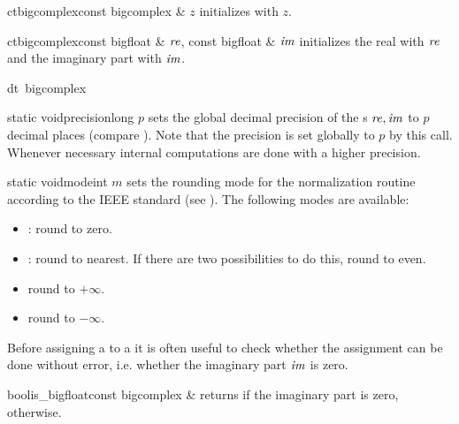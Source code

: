 \begin{fcode}{ct}{bigcomplex}{const bigcomplex & $z$}
  initializes with $z$.
\end{fcode}

\begin{fcode}{ct}{bigcomplex}{const bigfloat & $\mathit{re}$, const bigfloat & $\mathit{im}$}
  initializes the real with $\mathit{re}$ and the imaginary part with $\mathit{im}$.
\end{fcode}

\begin{fcode}{dt}{~bigcomplex}{}
\end{fcode}



\INIT

\begin{fcode}{static void}{precision}{long $p$}
  sets the global decimal precision of the s $\mathit{re}, \mathit{im}$ to $p$
  decimal places (compare ).  Note that the  precision is set
  globally to $p$ by this call.  Whenever necessary internal computations are done with a higher
  precision.
\end{fcode}

\begin{fcode}{static void}{mode}{int $m$}
  sets the rounding mode for the normalization routine according to the IEEE standard (see
  \cite{IEEE:754}).  The following modes are available:
  \begin{itemize}
  \item {}: round to zero.
  \item {}: round to nearest.  If there are two possibilities to do this, round to even.
  \item {} round to $+\infty$.
  \item {} round to $-\infty$.
  \end{itemize}
\end{fcode}



\TYPE

Before assigning a  to a  it is often useful to check whether
the assignment can be done without error, i.e. whether the imaginary part $\mathit{im}$ is zero.


\begin{fcode}{bool}{is_bigfloat}{const bigcomplex &}
  returns \TRUE if the imaginary part is zero, \FALSE otherwise.
\end{fcode}

